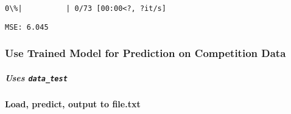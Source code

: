 \documentclass[11pt]{article}
\begin{document}
    
    \begin{Verbatim}[commandchars=\\\{\}]
  0\%|          | 0/73 [00:00<?, ?it/s]
    \end{Verbatim}

    
    \begin{Verbatim}[commandchars=\\\{\}]
MSE: 6.045
    \end{Verbatim}

    \hypertarget{use-trained-model-for-prediction-on-competition-data}{%
\subsubsection{Use Trained Model for Prediction on Competition
Data}\label{use-trained-model-for-prediction-on-competition-data}}

    \hypertarget{uses-data_test}{%
\subparagraph{\texorpdfstring{Uses
\texttt{data\_test}}{Uses data\_test}}\label{uses-data_test}}

    \hypertarget{load-predict-output-to-file.txt}{%
\paragraph{Load, predict, output to
file.txt}\label{load-predict-output-to-file.txt}}
\end{document}
